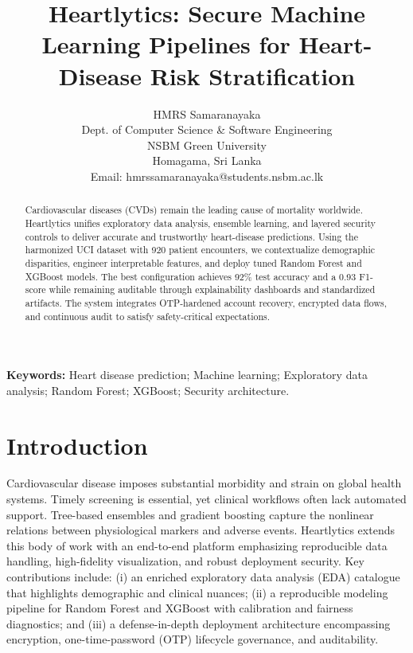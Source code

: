 \documentclass[12pt]{article}
\begin{document}
\title{Heartlytics: Secure Machine Learning Pipelines for Heart-Disease Risk Stratification}

\author{HMRS Samaranayaka\\Dept. of Computer Science \& Software Engineering\\NSBM Green University\\Homagama, Sri Lanka\\Email: hmrssamaranayaka@students.nsbm.ac.lk}\date{}

\maketitle

\begin{abstract}
Cardiovascular diseases (CVDs) remain the leading cause of mortality worldwide. Heartlytics unifies exploratory data analysis, ensemble learning, and layered security controls to deliver accurate and trustworthy heart-disease predictions. Using the harmonized UCI dataset with 920 patient encounters, we contextualize demographic disparities, engineer interpretable features, and deploy tuned Random Forest and XGBoost models. The best configuration achieves 92\% test accuracy and a 0.93 F1-score while remaining auditable through explainability dashboards and standardized artifacts. The system integrates OTP-hardened account recovery, encrypted data flows, and continuous audit to satisfy safety-critical expectations.
\end{abstract}

\noindent\textbf{Keywords:} Heart disease prediction; Machine learning; Exploratory data analysis; Random Forest; XGBoost; Security architecture.


\section{Introduction}
Cardiovascular disease imposes substantial morbidity and strain on global health systems. Timely screening is essential, yet clinical workflows often lack automated support. Tree-based ensembles and gradient boosting capture the nonlinear relations between physiological markers and adverse events. Heartlytics extends this body of work with an end-to-end platform emphasizing reproducible data handling, high-fidelity visualization, and robust deployment security. Key contributions include: (i) an enriched exploratory data analysis (EDA) catalogue that highlights demographic and clinical nuances; (ii) a reproducible modeling pipeline for Random Forest and XGBoost with calibration and fairness diagnostics; and (iii) a defense-in-depth deployment architecture encompassing encryption, one-time-password (OTP) lifecycle governance, and auditability.
\end{document}
